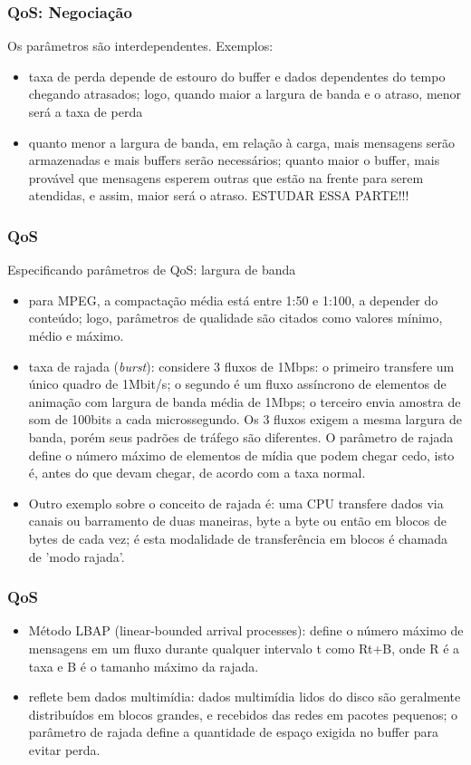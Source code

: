 \documentclass[]{beamer}
\begin{document}
\begin{frame}
  \frametitle{QoS: Negociação}
Os parâmetros são interdependentes. Exemplos:
\begin{itemize}
  \item taxa de perda depende de estouro do buffer e dados dependentes do tempo
chegando atrasados; logo, quando maior a largura de banda e o atraso, menor será
a taxa de perda
  \item quanto menor a largura de banda, em relação à carga, 
mais mensagens serão armazenadas e mais buffers serão necessários; quanto maior o buffer,
mais provável que mensagens esperem outras que estão na frente para serem atendidas, e
assim, maior será o atraso. ESTUDAR ESSA PARTE!!!
\end{itemize}
\end{frame}

\begin{frame}[allowframebreaks]
  \frametitle{QoS}
Especificando parâmetros de QoS: largura de banda
\begin{itemize}
  \item  para MPEG, a compactação média está entre 1:50 e 1:100, a depender
do conteúdo; logo, parâmetros de qualidade são 
citados como valores mínimo, médio e máximo.
  \item taxa de rajada 
(\emph{burst}): considere 3 fluxos de 1Mbps: o primeiro 
transfere um único quadro de 1Mbit/s;
o segundo é um fluxo assíncrono de elementos de animação
com largura de banda média de 1Mbps; o terceiro envia amostra de 
som de 100bits a cada microssegundo. 
Os 3 fluxos exigem a mesma largura de banda, porém
seus padrões de tráfego são diferentes. 
O parâmetro de rajada define o número máximo de 
elementos de mídia que podem chegar cedo, 
isto é, antes do que devam chegar, de acordo
com a taxa normal.
 \item Outro exemplo sobre o conceito de rajada é: 
 uma CPU transfere dados via canais ou barramento 
de duas maneiras, byte a byte ou então em blocos de bytes de cada vez; 
é esta modalidade de transferência em blocos é 
chamada de 'modo rajada'.\cite{site1:2011}
\end{itemize}
\end{frame}


\begin{frame}
  \frametitle{QoS}
\begin{itemize}
  \item %
Método LBAP (linear-bounded arrival processes): 
define o número máximo de mensagens em um fluxo durante qualquer intervalo t como Rt+B,
onde R é a taxa e B é o tamanho máximo da rajada.
  \item reflete bem dados multimídia: dados multimídia lidos do disco são geralmente 
distribuídos em blocos grandes,
e recebidos das redes em pacotes pequenos; o parâmetro de rajada define a quantidade de
espaço exigida no buffer para evitar perda.
\end{itemize}
\end{frame}
\end{document}
